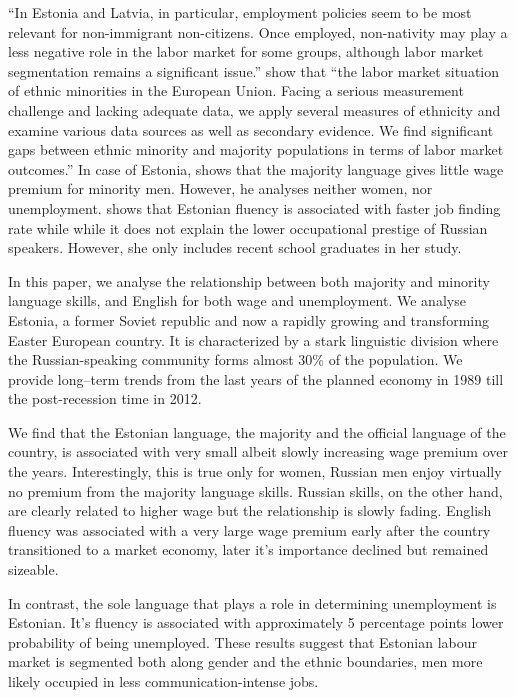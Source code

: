 \documentclass[12pt, a4paper]{article}
\begin{document}
\enquote{In Estonia and Latvia, in particular, employment
	policies seem to be most relevant for non-immigrant non-citizens. Once employed,
	non-nativity may play a less negative role in the labor market for some groups,
	although labor market segmentation remains a significant issue.}
\cite{Kahanec2010} show that \enquote{the labor market situation of ethnic minorities in the European
	Union. Facing a serious measurement challenge and lacking adequate data, we apply
	several measures of ethnicity and examine various data sources as well as secondary
	evidence. We find significant gaps between ethnic minority and majority populations in
	terms of labor market outcomes.}
In case of Estonia,
\citet{Toomet2011} shows that the majority language gives little wage
premium for minority men.  However, he analyses neither women, nor
unemployment.  \citet{Lindemann2013} shows that Estonian fluency
is associated with faster job finding rate while while it does not
explain the lower occupational prestige of Russian speakers.  However,
she only includes recent school graduates in her study.

In this paper, we analyse the relationship between both
majority and minority language skills, and English for both
wage and unemployment.  We analyse Estonia, a former Soviet republic
and now a rapidly growing and
transforming Easter European country.  It is characterized by a stark linguistic division
where the Russian-speaking community forms almost 30\% of
the population.  We provide long--term trends from the last years
of the planned economy in 1989 till the post-recession time in 2012.

We find that the Estonian language, the majority and the official
language of the country, is associated with very
small albeit slowly increasing wage premium over
the years.  Interestingly, this is true only for women, Russian men enjoy
virtually no premium from the majority language skills.
Russian skills, on the other hand, are clearly related to
higher wage but the relationship is slowly fading.  English fluency was
associated with a very large wage premium early after the country
transitioned to a market economy, later it's importance
declined but remained sizeable.  

In contrast, the sole language that plays a role in determining
unemployment is Estonian.  It's fluency is associated with
approximately 5 percentage points lower probability of being unemployed.
These results suggest that Estonian labour market is
segmented both along gender and the ethnic boundaries, men
more likely occupied in less communication-intense jobs.
\end{document}
